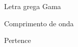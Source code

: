 %
%

\begin{simbolos}
	\item[$ \Gamma $] Letra grega Gama
	\item[$ \lambda $] Comprimento de onda
	\item[$ \in $] Pertence
\end{simbolos}
